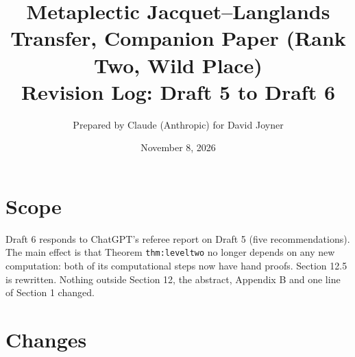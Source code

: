 \documentclass[11pt]{article}
\title{Metaplectic Jacquet--Langlands Transfer, Companion Paper (Rank Two, Wild Place)\\Revision Log: Draft 5 to Draft 6}
\author{Prepared by Claude (Anthropic) for David Joyner}
\date{November 8, 2026}
\begin{document}
\maketitle
\section*{Scope}
Draft 6 responds to ChatGPT's referee report on Draft 5 (five
recommendations).  The main effect is that Theorem \texttt{thm:leveltwo}
no longer depends on any new computation: both of its computational
steps now have hand proofs.  Section 12.5 is rewritten.  Nothing outside
Section 12, the abstract, Appendix B and one line of Section 1 changed.
\section*{Changes}
\end{document}
